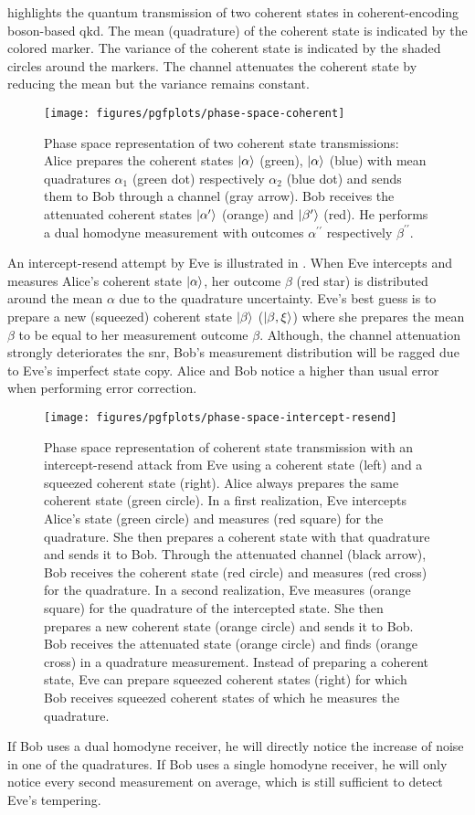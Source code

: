  highlights the quantum transmission of two coherent states in coherent-encoding boson-based \gls{qkd}.
The mean (quadrature) of the coherent state is indicated by the colored marker.
The variance of the coherent state is indicated by the shaded circles around the markers.
The channel attenuates the coherent state by reducing the mean but the variance remains constant.
\begin{figure}[htb]
	\centering
	\texttt{[image: figures/pgfplots/phase-space-coherent]}
	\caption{Phase space representation of two coherent state transmissions: Alice prepares the coherent states $\lvert\alpha\rangle$ (green), $\lvert\alpha\rangle$ (blue) with mean quadratures $\alpha_1$ (green dot) respectively $\alpha_2$ (blue dot) and sends them to Bob through a channel (gray arrow). Bob receives the attenuated coherent states $\lvert\alpha^\prime\rangle$ (orange) and $\lvert\beta^\prime\rangle$ (red). He performs a dual homodyne measurement with outcomes $\alpha^{\prime\prime}$ respectively $\beta^{\prime\prime}$.}\label{fig:phase_space_coherent}
\end{figure}
An intercept-resend attempt by Eve is illustrated in .
When Eve intercepts and measures Alice's coherent state $\lvert\alpha\rangle$, her outcome $\beta$ (red star) is distributed around the mean $\alpha$ due to the quadrature uncertainty.
Eve's best guess is to prepare a new (squeezed) coherent state $\lvert\beta\rangle$ ($\lvert\beta,\xi\rangle$) where she prepares the mean $\beta$ to be equal to her measurement outcome $\beta$.
Although, the channel attenuation strongly deteriorates the \gls{snr}, Bob's measurement distribution will be ragged due to Eve's imperfect state copy.
Alice and Bob notice a higher than usual error when performing error correction.
\begin{figure}[htb]
	\centering
	\texttt{[image: figures/pgfplots/phase-space-intercept-resend]}
	\caption{Phase space representation of coherent state transmission with an intercept-resend attack from Eve using a coherent state (left) and a squeezed coherent state (right). Alice always prepares the same coherent state (green circle). In a first realization, Eve intercepts Alice's state (green circle) and measures (red square) for the quadrature. She then prepares a coherent state with that quadrature and sends it to Bob. Through the attenuated channel (black arrow), Bob receives the coherent state (red circle) and measures (red cross) for the quadrature. In a second realization, Eve measures (orange square) for the quadrature of the intercepted state. She then prepares a new coherent state (orange circle) and sends it to Bob. Bob receives the attenuated state (orange circle) and finds (orange cross) in a quadrature measurement. Instead of preparing a coherent state, Eve can prepare squeezed coherent states (right) for which Bob receives squeezed coherent states of which he measures the quadrature.}\label{fig:phase_space_intercept_resend}
\end{figure}
If Bob uses a dual homodyne receiver, he will directly notice the increase of noise in one of the quadratures.
If Bob uses a single homodyne receiver, he will only notice every second measurement on average, which is still sufficient to detect Eve's tempering.